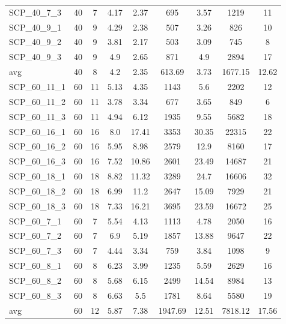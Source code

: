 \begin{table}[!ht]
{\begin{tabular}{lcccccccc}
SCP\_40\_7\_3 & 40 & 7 & 4.17 &  \textcolor{blue2}{2.37} & 695 & 3.57 & 1219 & 11 \\
SCP\_40\_9\_1 & 40 & 9 & 4.29 &  \textcolor{blue2}{2.38} & 507 & 3.26 & 826 & 10 \\
SCP\_40\_9\_2 & 40 & 9 & 3.81 &  \textcolor{blue2}{2.17} & 503 & 3.09 & 745 & 8 \\
SCP\_40\_9\_3 & 40 & 9 & 4.9 &  \textcolor{blue2}{2.65} & 871 & 4.9 & 2894 & 17 \\
\cline{1-9} avg & 40 & 8 & 4.2 & 2.35& 613.69 & 3.73& 1677.15 & 12.62\\ \cline{1-9}
SCP\_60\_11\_1 & 60 & 11 & 5.13 &  \textcolor{blue2}{4.35} & 1143 & 5.6 & 2202 & 12 \\
SCP\_60\_11\_2 & 60 & 11 & 3.78 &  \textcolor{blue2}{3.34} & 677 & 3.65 & 849 & 6 \\
SCP\_60\_11\_3 & 60 & 11 &  \textcolor{blue2}{4.94} & 6.12 & 1935 & 9.55 & 5682 & 18 \\
SCP\_60\_16\_1 & 60 & 16 &  \textcolor{blue2}{8.0} & 17.41 & 3353 & 30.35 & 22315 & 22 \\
SCP\_60\_16\_2 & 60 & 16 &  \textcolor{blue2}{5.95} & 8.98 & 2579 & 12.9 & 8160 & 17 \\
SCP\_60\_16\_3 & 60 & 16 &  \textcolor{blue2}{7.52} & 10.86 & 2601 & 23.49 & 14687 & 21 \\
SCP\_60\_18\_1 & 60 & 18 &  \textcolor{blue2}{8.82} & 11.32 & 3289 & 24.7 & 16606 & 32 \\
SCP\_60\_18\_2 & 60 & 18 &  \textcolor{blue2}{6.99} & 11.2 & 2647 & 15.09 & 7929 & 21 \\
SCP\_60\_18\_3 & 60 & 18 &  \textcolor{blue2}{7.33} & 16.21 & 3695 & 23.59 & 16672 & 25 \\
SCP\_60\_7\_1 & 60 & 7 & 5.54 &  \textcolor{blue2}{4.13} & 1113 & 4.78 & 2050 & 16 \\
SCP\_60\_7\_2 & 60 & 7 & 6.9 &  \textcolor{blue2}{5.19} & 1857 & 13.88 & 9647 & 22 \\
SCP\_60\_7\_3 & 60 & 7 & 4.44 &  \textcolor{blue2}{3.34} & 759 & 3.84 & 1098 & 9 \\
SCP\_60\_8\_1 & 60 & 8 & 6.23 &  \textcolor{blue2}{3.99} & 1235 & 5.59 & 2629 & 16 \\
SCP\_60\_8\_2 & 60 & 8 &  \textcolor{blue2}{5.68} & 6.15 & 2499 & 14.54 & 8984 & 13 \\
SCP\_60\_8\_3 & 60 & 8 & 6.63 &  \textcolor{blue2}{5.5} & 1781 & 8.64 & 5580 & 19 \\
\cline{1-9} avg & 60 & 12 & 5.87 & 7.38& 1947.69 & 12.51& 7818.12 & 17.56\\ \cline{1-9}

\end{tabular}}
\end{table}
